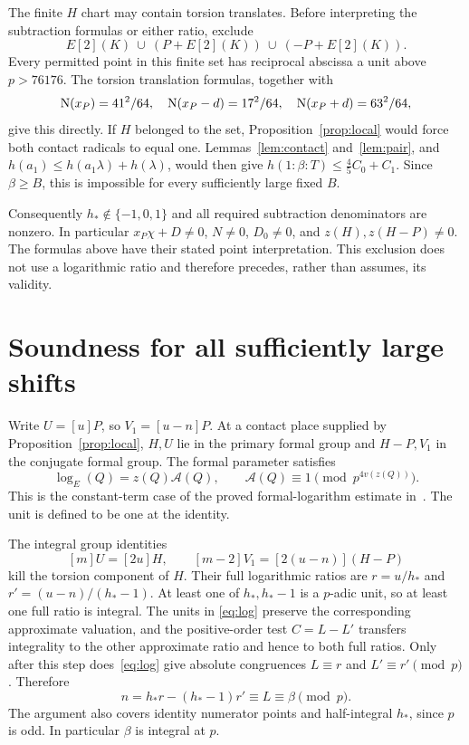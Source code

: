 \documentclass[11pt,a4paper]{article}
\begin{document}
The finite $H$ chart may contain torsion translates. Before interpreting
the subtraction formulas or either ratio, exclude
\[
                  E[2](K)\ \cup\ (P+E[2](K))\ \cup\ (-P+E[2](K)).
\]
Every permitted point in this finite set has reciprocal abscissa a unit
above $p>76176$. The torsion translation formulas, together with
\[
 \operatorname{N}(x_P)=41^2/64,\quad
 \operatorname{N}(x_P-d)=17^2/64,\quad \operatorname{N}(x_P+d)=63^2/64,
\]
give this directly. If $H$ belonged to the set, Proposition~\ref{prop:local}
would force both contact radicals to equal one. Lemmas~\ref{lem:contact}
and~\ref{lem:pair}, and $h(a_1)\le h(a_1\lambda)+h(\lambda)$, would
then give $h(1:\beta:T)\le\frac45C_0+C_1$. Since $\beta\ge B$, this is
impossible for every sufficiently large fixed $B$.

Consequently $h_*\notin\{-1,0,1\}$ and all required subtraction
denominators are nonzero. In particular $x_P\chi+D\ne0$, $N\ne0$,
$D_0\ne0$, and $z(H),z(H-P)\ne0$. The formulas above have their
stated point interpretation. This exclusion does not use a logarithmic
ratio and therefore precedes, rather than assumes, its validity.

\section{Soundness for all sufficiently large shifts}

Write $U=[u]P$, so $V_1=[u-n]P$. At a contact place supplied by
Proposition~\ref{prop:local}, $H,U$ lie in the primary formal group
and $H-P,V_1$ in the conjugate formal group. The formal parameter satisfies
\begin{equation}\label{eq:log}
 \log_E(Q)=z(Q)\mathcal A(Q),\qquad
 \mathcal A(Q)\equiv1\pmod{p^{4v(z(Q))}}.
\end{equation}
This is the constant-term case of the proved formal-logarithm estimate
in~\cite{Logs}. The unit is defined to be one at the identity.

The integral group identities
\[
                [m]U=[2u]H,\qquad
                [m-2]V_1=[2(u-n)](H-P)
\]
kill the torsion component of $H$. Their full logarithmic ratios are
$r=u/h_*$ and $r'=(u-n)/(h_*-1)$. At least one of $h_*,h_*-1$ is a
$p$-adic unit, so at least one full ratio is integral. The units in
\eqref{eq:log} preserve the corresponding approximate valuation, and
the positive-order test $C=L-L'$ transfers integrality to the other
approximate ratio and hence to both full ratios.
Only after this step does~\eqref{eq:log} give absolute congruences
$L\equiv r$ and $L'\equiv r'\pmod p$. Therefore
\[
 n=h_*r-(h_*-1)r'\equiv L\equiv\beta\pmod p.
\]
The argument also covers identity numerator points and half-integral
$h_*$, since $p$ is odd. In particular $\beta$ is integral at $p$.
\end{document}
